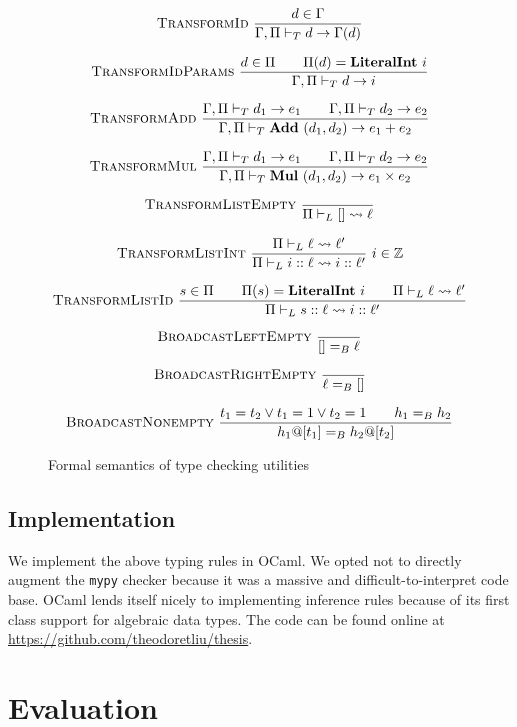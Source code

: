 \documentclass[12pt]{report}
\begin{document}
\begin{figure}
    $$\textsc{TransformId}~\frac{d \in \Gamma}{\Gamma, \Pi \vdash_T d \rightarrow \Gamma(d)}$$

    $$\textsc{TransformIdParams}~\frac{d \in \Pi \qquad \Pi(d) = \textbf{LiteralInt}~i}{\Gamma, \Pi \vdash_T d \rightarrow i}$$

    $$\textsc{TransformAdd}~\frac{\Gamma, \Pi \vdash_T d_1 \rightarrow e_1 \qquad \Gamma, \Pi \vdash_T d_2 \rightarrow e_2}{\Gamma , \Pi \vdash_T \textbf{Add}~(d_1, d_2) \rightarrow e_1 + e_2}$$

    $$\textsc{TransformMul}~\frac{\Gamma, \Pi \vdash_T d_1 \rightarrow e_1 \qquad \Gamma, \Pi \vdash_T d_2 \rightarrow e_2}{\Gamma, \Pi \vdash_T \textbf{Mul}~(d_1, d_2) \rightarrow e_1 \times e_2}$$

    $$\textsc{TransformListEmpty}~\frac{}{\Pi \vdash_L [] \rightsquigarrow \ell}$$

    $$\textsc{TransformListInt}~\frac{\Pi \vdash_L \ell \rightsquigarrow \ell'}{\Pi \vdash_L i :: \ell \rightsquigarrow i :: \ell'}~i \in \mathbb Z$$

    $$\textsc{TransformListId}~\frac{s \in \Pi \qquad \Pi(s) = \textbf{LiteralInt}~i \qquad \Pi \vdash_L \ell \rightsquigarrow \ell'}{\Pi \vdash_L s :: \ell \rightsquigarrow i :: \ell'}$$

    $$\textsc{BroadcastLeftEmpty}~\frac{}{[] =_B \ell}$$

    $$\textsc{BroadcastRightEmpty}~\frac{}{\ell =_B []}$$

    $$\textsc{BroadcastNonempty}~\frac{t_1 = t_2 \lor t_1 = 1 \lor t_2 = 1 \qquad h_1 =_B h_2}{h_1 @ [t_1] =_B h_2 @ [t_2]}$$

    \caption{Formal semantics of type checking utilities}
    \label{semantics:utils}
\end{figure}

\section{Implementation}

We implement the above typing rules in OCaml. We opted not to directly augment the \texttt{mypy} checker because it was a massive and difficult-to-interpret code base. OCaml lends itself nicely to implementing inference rules because of its first class support for algebraic data types. The code can be found online at \url{https://github.com/theodoretliu/thesis}.

\chapter{Evaluation}
\end{document}
